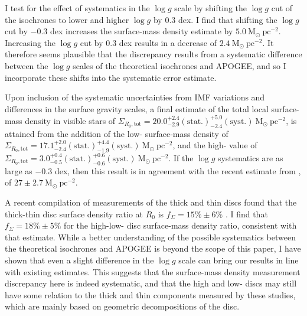 I test for the effect of systematics in the $\log{g}$ scale by shifting the $\log{g}$ cut of the isochrones to lower and higher $\log{g}$ by $0.3$ dex. I find that shifting the $\log{g}$ cut by $-0.3$ dex increases the surface-mass density estimate by $5.0\ \mathrm{M_{\odot}\ pc^{-2}}$. Increasing the $\log{g}$ cut by $0.3$ dex results in a decrease of $ 2.4\ \mathrm{M_{\odot}\ pc^{-2}}$. It therefore seems plausible that the discrepancy results from a systematic difference between the $\log{g}$ scales of the theoretical isochrones and APOGEE, and so I incorporate these shifts into the systematic error estimate. 

Upon inclusion of the systematic uncertainties from IMF variations and differences in the surface gravity scales, a final estimate of the total local surface-mass density in visible stars of $\Sigma_{R_0, \text{tot}} = 20.0_{-2.9}^{+2.4}\mathrm{(stat.)}_{-2.4}^{+5.0}\mathrm{(syst.)}\ \mathrm{M_{\odot} \ pc^{-2}}$, is attained from the addition of the low-\afe{} surface-mass density of $\Sigma_{R_0, \text{tot}} = 17.1_{-2.4}^{+2.0}\mathrm{(stat.)}_{-1.9}^{+4.4}\mathrm{(syst.)}\ \mathrm{M_{\odot} \ pc^{-2}}$, and the high-\afe{} value of $\Sigma_{R_0, \text{tot}} = 3.0_{-0.5}^{+0.4}\mathrm{(stat.)}_{-0.6}^{+0.6}\mathrm{(syst.)}\ \mathrm{M_{\odot} \ pc^{-2}}$.  If the $\log{g}$ systematics are as large as $-0.3$ dex, then this result is in agreement with the recent estimate from \citet{2015ApJ...814...13M}, of $27\pm 2.7\ \mathrm{M_{\odot} \ pc^{-2}}$.

A recent compilation of measurements of the thick and thin discs found that the thick-thin disc surface density ratio at $R_0$ is $f_{\Sigma} = 15\% \pm 6\%$ \citep{2016ARA&A..54..529B}. I find that $f_{\Sigma} = 18\% \pm 5\%$ for the high-low-\afe{} disc surface-mass density ratio, consistent with that estimate. While a better understanding of the possible systematics between the theoretical isochrones and APOGEE is beyond the scope of this paper, I have shown that even a slight difference in the $\log{g}$ scale can bring our results in line with existing estimates. This suggests that the surface-mass density measurement discrepancy here is indeed systematic, and that the high and low-\afe{} discs may still have some relation to the thick and thin components measured by these studies, which are mainly based on geometric decompositions of the disc. 

